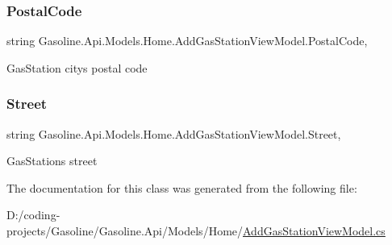 \subsubsection{\texorpdfstring{PostalCode}{PostalCode}}
{\footnotesize\ttfamily string Gasoline.\+Api.\+Models.\+Home.\+Add\+Gas\+Station\+View\+Model.\+Postal\+Code\hspace{0.3cm}{\ttfamily [get]}, {\ttfamily [set]}}



Gas\+Station city\textquotesingle{}s postal code 

\mbox{\label{class_gasoline_1_1_api_1_1_models_1_1_home_1_1_add_gas_station_view_model_a273ca6e2a04e2c845ee2caa14c1b12d2}} 
\subsubsection{\texorpdfstring{Street}{Street}}
{\footnotesize\ttfamily string Gasoline.\+Api.\+Models.\+Home.\+Add\+Gas\+Station\+View\+Model.\+Street\hspace{0.3cm}{\ttfamily [get]}, {\ttfamily [set]}}



Gas\+Station\textquotesingle{}s street 



The documentation for this class was generated from the following file\+:\begin{DoxyCompactItemize}
\item 
D\+:/coding-\/projects/\+Gasoline/\+Gasoline.\+Api/\+Models/\+Home/\mbox{\hyperlink{_add_gas_station_view_model_8cs}{Add\+Gas\+Station\+View\+Model.\+cs}}\end{DoxyCompactItemize}
